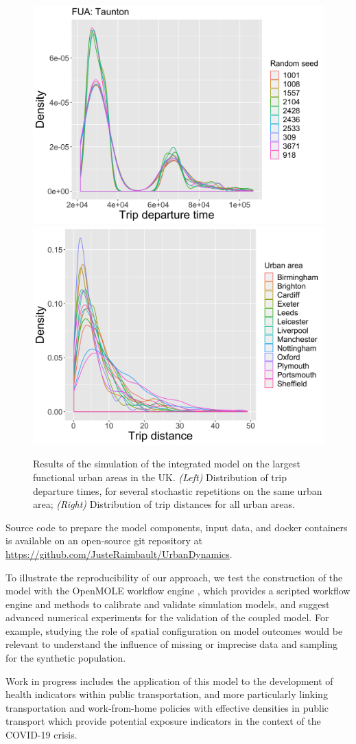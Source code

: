 \documentclass[3p,times,procedia]{elsarticle}
\begin{document}
\begin{figure}[t]\vspace*{4pt}
\begin{center}
\includegraphics[width=0.48\linewidth]{figures/stochasticity_Taunton.png}	
\includegraphics[width=0.48\linewidth]{figures/distances_allFUAs.png}
\end{center}
\caption{Results of the simulation of the integrated model on the largest functional urban areas in the UK. \textit{(Left)} Distribution of trip departure times, for several stochastic repetitions on the same urban area; \textit{(Right)} Distribution of trip distances for all urban areas.\label{fig:fig2}}
\end{figure}


Source code to prepare the model components, input data, and docker containers is available on an open-source git repository at \url{https://github.com/JusteRaimbault/UrbanDynamics}.
 

To illustrate the reproducibility of our approach, we test the construction of the model with the OpenMOLE workflow engine \citep{reuillon2013openmole}, which provides a scripted workflow engine and methods to calibrate and validate simulation models, and suggest advanced numerical experiments for the validation of the coupled model. For example, studying the role of spatial configuration on model outcomes \citep{raimbault2019space} would be relevant to understand the influence of missing or imprecise data and sampling for the synthetic population.


Work in progress includes the application of this model to the development of health indicators within public transportation, and more particularly linking transportation and work-from-home policies with effective densities in public transport which provide potential exposure indicators in the context of the COVID-19 crisis.
\end{document}
